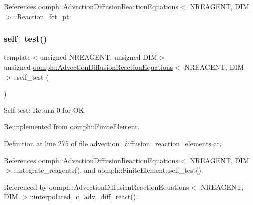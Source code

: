 References oomph\+::\+Advection\+Diffusion\+Reaction\+Equations$<$ N\+R\+E\+A\+G\+E\+N\+T, D\+I\+M $>$\+::\+Reaction\+\_\+fct\+\_\+pt.

\mbox{\label{classoomph_1_1AdvectionDiffusionReactionEquations_a30b954f7ec758cf93a4b477a8652c9e2}} 
\subsubsection{\texorpdfstring{self\+\_\+test()}{self\_test()}}
{\footnotesize\ttfamily template$<$unsigned N\+R\+E\+A\+G\+E\+NT, unsigned D\+IM$>$ \\
unsigned \hyperlink{classoomph_1_1AdvectionDiffusionReactionEquations}{oomph\+::\+Advection\+Diffusion\+Reaction\+Equations}$<$ N\+R\+E\+A\+G\+E\+NT, D\+IM $>$\+::self\+\_\+test (\begin{DoxyParamCaption}{ }\end{DoxyParamCaption})\hspace{0.3cm}{\ttfamily [virtual]}}



Self-\/test\+: Return 0 for OK. 



Reimplemented from \hyperlink{classoomph_1_1FiniteElement_af94c5a5e22175d5420b33b3b79e46ed3}{oomph\+::\+Finite\+Element}.



Definition at line 275 of file advection\+\_\+diffusion\+\_\+reaction\+\_\+elements.\+cc.



References oomph\+::\+Advection\+Diffusion\+Reaction\+Equations$<$ N\+R\+E\+A\+G\+E\+N\+T, D\+I\+M $>$\+::integrate\+\_\+reagents(), and oomph\+::\+Finite\+Element\+::self\+\_\+test().



Referenced by oomph\+::\+Advection\+Diffusion\+Reaction\+Equations$<$ N\+R\+E\+A\+G\+E\+N\+T, D\+I\+M $>$\+::interpolated\+\_\+c\+\_\+adv\+\_\+diff\+\_\+react().

\mbox{\label{classoomph_1_1AdvectionDiffusionReactionEquations_acf51066b96a5406d5ef7dd88c0b7393d}} 
